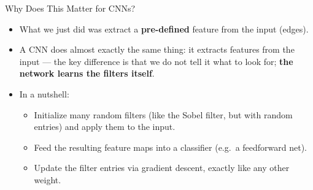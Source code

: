 \begin{vbframe}{Why Does This Matter for CNNs?}
  \begin{itemize}
    \item What we just did was extract a \textbf{pre-defined} feature from the input (edges).
    \item A CNN does almost exactly the same thing: it extracts features from the input --- the key difference is that we do not tell it what to look for; \textbf{the network learns the filters itself}.
    \item In a nutshell:
    \begin{itemize}
      \item Initialize many random filters (like the Sobel filter, but with random entries) and apply them to the input.
      \item Feed the resulting feature maps into a classifier (e.g.\ a feedforward net).
      \item Update the filter entries via gradient descent, exactly like any other weight.
    \end{itemize}
  \end{itemize}
\end{vbframe}

